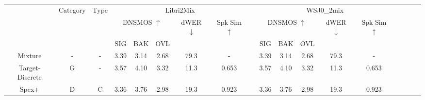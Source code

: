 \documentclass[conference]{IEEEtran}
\begin{document}
\begin{table}
  \renewcommand{\arraystretch}{1.2}
  \begin{center}
  \begin{tabular}{cccccccccccccccccc}
    \Xhline{2\arrayrulewidth} %
  \multirow{3}{*}{System} & \multicolumn{1}{l}{\multirow{3}{*}{Category}} & \multicolumn{1}{l}{\multirow{3}{*}{Type}} &  \multicolumn{5}{c}{Libri2Mix}                    &                               & \multicolumn{5}{c}{WSJ0\_2mix}                                                  \\
  \cline{4-8} \cline{10-14}
                          & \multicolumn{1}{l}{}                                                 & \multicolumn{1}{l}{}                            & \multicolumn{3}{c}{DNSMOS $\uparrow$} & dWER $\downarrow$ & Spk Sim $\uparrow$ &  & \multicolumn{3}{c}{DNSMOS $\uparrow$} & dWER $\downarrow$ & Spk Sim $\uparrow$  \\ \cline{4-6} \cline{10-12}
                          & \multicolumn{1}{l}{}                                                    & \multicolumn{1}{l}{}                            & SIG         & BAK        & OVL        &                   &        &             & SIG         & BAK        & OVL        &                   &                    \\ \hline
  Mixture                 & -                                             & -                                                                                           & 3.39        & 3.14       & 2.68       & 79.3            & -        &           & 3.39        & 3.14       & 2.68       & 79.3            & -                  \\
  Target-Discrete         & G                                             & -                                                                                          & 3.57        & 4.10       & 3.32       & 11.3            & 0.653     &          & 3.57        & 4.10       & 3.32       & 11.3            & 0.653               \\ \hline
  Spex+                   & D                                             & C                                                                                  & 3.36        & 3.76       & 2.98       & 19.3            & 0.923     &          & 3.36        & 3.76       & 2.98       & 19.3            & 0.923             \\ \hline

\end{tabular}
\end{center}
\end{table}
\end{document}
